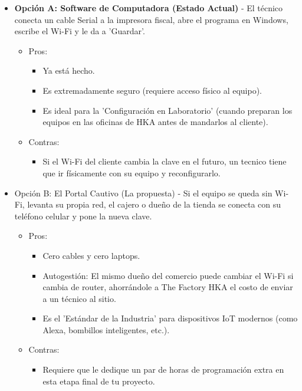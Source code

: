 \documentclass[12pt, a4paper]{article}
\begin{document}
    \begin{itemize}
        \item \textbf{Opción A: Software de Computadora (Estado Actual)} - El técnico conecta un cable Serial a la impresora fiscal, abre el programa en Windows, escribe el Wi-Fi y le da a 'Guardar'.

        \begin{itemize}
            \item Pros: 
            \begin{itemize}
                \item Ya está hecho.
                \item Es extremadamente seguro (requiere acceso físico al equipo).
                \item Es ideal para la 'Configuración en Laboratorio' (cuando preparan los equipos en las oficinas de HKA antes de mandarlos al cliente).
            \end{itemize}
            \item Contras:
            \begin{itemize}
                \item Si el Wi-Fi del cliente cambia la clave en el futuro, un tecnico tiene que ir físicamente con su equipo y reconfigurarlo.
            \end{itemize}
        \end{itemize}

        \item Opción B: El Portal Cautivo (La propuesta) - Si el equipo se queda sin Wi-Fi, levanta su propia red, el cajero o dueño de la tienda se conecta con su teléfono celular y pone la nueva clave.

        \begin{itemize}
            \item Pros:
            \begin{itemize}
                \item Cero cables y cero laptops.
                \item Autogestión: El mismo dueño del comercio puede cambiar el Wi-Fi si cambia de router, ahorrándole a The Factory HKA el costo de enviar a un técnico al sitio.
                \item Es el 'Estándar de la Industria' para dispositivos IoT modernos (como Alexa, bombillos inteligentes, etc.).
            \end{itemize}
            \item Contras:
            \begin{itemize}
                \item Requiere que le dedique un par de horas de programación extra en esta etapa final de tu proyecto.
            \end{itemize}
        \end{itemize}
    \end{itemize}
    
\end{document}
